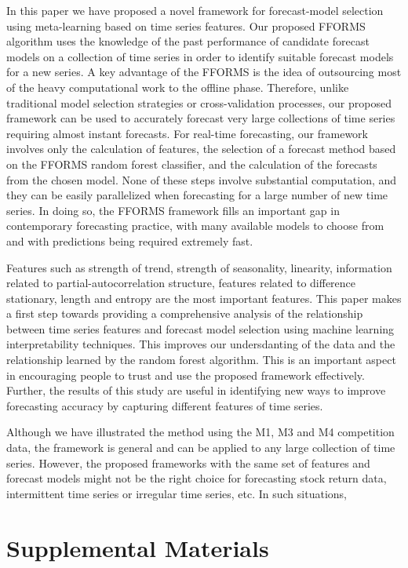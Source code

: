 \documentclass[11pt,a4paper,]{article}
\begin{document}
In this paper we have proposed a novel framework for forecast-model selection using meta-learning based on time series features. Our proposed FFORMS algorithm uses the knowledge of the past performance of candidate forecast models on a collection of time series in order to identify suitable forecast models for a new series. A key advantage of the FFORMS is the idea of outsourcing most of the heavy computational work to the offline phase. Therefore, unlike traditional model selection strategies or cross-validation processes, our proposed framework can be used to accurately forecast very large collections of time series requiring almost instant forecasts. For real-time forecasting, our framework involves only the calculation of features, the selection of a forecast method based on the FFORMS random forest classifier, and the calculation of the forecasts from the chosen model. None of these steps involve substantial computation, and they can be easily parallelized when forecasting for a large number of new time series. In doing so, the FFORMS framework
fills an important gap in contemporary forecasting practice, with many available models
to choose from and with predictions being required extremely fast.

Features such as strength of trend, strength of seasonality, linearity, information related to partial-autocorrelation structure, features related to difference stationary, length and entropy are the most important features. This paper makes a first step towards providing a comprehensive analysis of the relationship between time series features and forecast model selection using machine learning interpretability techniques. This improves our undersdanting of the data and the relationship learned by the random forest algorithm. This is an important aspect in encouraging people to trust and use the proposed framework effectively. Further, the results of this study are useful in identifying new ways to improve forecasting accuracy by capturing different features of time series.

Although we have illustrated the method using the M1, M3 and M4 competition data, the framework is general and can be applied to any large collection of time series. However, the proposed frameworks with the same set of features and forecast
models might not be the right choice for forecasting stock return data, intermittent time series or irregular
time series, etc. In such situations,

\hypertarget{supplemental-materials}{%
\section*{Supplemental Materials}\label{supplemental-materials}}
\end{document}
